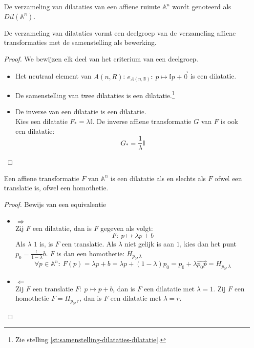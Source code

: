 \documentclass[main.tex]{subfiles}
\begin{document}
\begin{de}
  De verzameling van dilataties van een affiene ruimte $\mathbb{A}^{n}$ wordt genoteerd als $Dil(\mathbb{A}^{n})$.
\end{de}

\begin{st}
  De verzameling van dilataties vormt een deelgroep van de verzameling affiene transformaties met de samenstelling als bewerking.

  \begin{proof}
    We bewijzen elk deel van het criterium van een deelgroep.
    \begin{itemize}
    \item Het neutraal element van $A(n,R)$: $e_{A(n,\mathbb{R})}:\ p \mapsto \mathbb{I} p + \vec{0}$ is een dilatatie.
    \item De samenstelling van twee dilataties is een dilatatie.\footnote{Zie stelling \ref{st:samenstelling-dilataties-dilatatie}.}
    \item De inverse van een dilatatie is een dilatatie.\\
      Kies een dilatatie $F_{*} = \lambda \mathbb{I} $. De inverse affiene transformatie $G$ van $F$ is ook een dilatatie:
      \[ G_{*} = \frac{1}{\lambda} \mathbb{I}\]
    \end{itemize}
  \end{proof}
\end{st}

\begin{st}
  Een affiene transformatie $F$ van $\mathbb{A}^{n}$ is een dilatatie als en slechts als $F$ ofwel een translatie is, ofwel een homothetie.

  \begin{proof}
    Bewijs van een equivalentie\\
    \begin{itemize}
    \item $\Rightarrow$\\
      Zij $F$ een dilatatie, dan is $F$ gegeven als volgt:
      \[ F:\ p \mapsto \lambda p + b\]
      Als $\lambda$ $1$ is, is $F$ een translatie.
      Als $\lambda$ niet gelijk is aan $1$, kies dan het punt $p_{0} = \frac{1}{1-\lambda}b$.
      $F$ is dan een homothetie: $H_{p_{0},\lambda}$
      \[\forall p\in \mathbb{A}^{n}:\ F(p) = \lambda p + b = \lambda p + (1 - \lambda) p_{0} = p_{0} + \lambda \overrightarrow{p_{0}p} = H_{p_{0},\lambda} \]
    \item $\Leftarrow$\\
      Zij $F$ een translatie $F:\ p \mapsto p + b$, dan is $F$ een dilatatie met $\lambda = 1$.
      Zij $F$ een homothetie $F = H_{p_{0},r}$, dan is $F$ een dilatatie met $\lambda = r$.
    \end{itemize}
  \end{proof}
\end{st}
\end{document}
